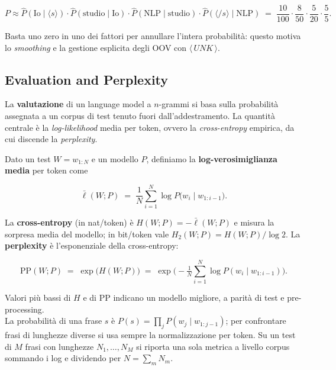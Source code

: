     $$
    P \approx \hat P(\text{Io}\mid \langle s\rangle) \cdot \hat P(\text{studio}\mid \text{Io}) \cdot \hat P(\text{NLP}\mid \text{studio}) \cdot \hat P(\langle/ s\rangle \mid \text{NLP}) \;=\; \frac{10}{100} \cdot \frac{8}{50} \cdot \frac{5}{20} \cdot \frac{5}{5}.
    $$
    
    Basta uno zero in uno dei fattori per annullare l'intera probabilità: questo motiva lo \textit{smoothing} e la gestione esplicita degli OOV con $\langle\,UNK\,\rangle$.

    \newpage

    \subsection{Evaluation and Perplexity}
    
        La \textbf{valutazione} di un language model a $n$-grammi si basa sulla probabilità assegnata a un corpus di test tenuto fuori dall’addestramento. La quantità centrale è la \textit{log-likelihood} media per token, ovvero la \textit{cross-entropy} empirica, da cui discende la \textit{perplexity}.
        
        Dato un test $W=w_{1:N}$ e un modello $P$, definiamo la \textbf{log-verosimiglianza media} per token come
        
        $$
        \bar{\ell}(W;P) \;=\; \frac{1}{N} \sum_{i=1}^{N} \log P\!\big(w_i \mid w_{1:i-1}\big).
        $$
        
        La \textbf{cross-entropy} (in nat/token) è $H(W;P) = -\bar{\ell}(W;P)$ e misura la sorpresa media del modello; in bit/token vale $H_2(W;P)=H(W;P)/\log 2$. La \textbf{perplexity} è l’esponenziale della cross-entropy:
        
        $$
        \mathrm{PP}(W;P) \;=\; \exp\!\big( H(W;P) \big) \;=\; \exp\!\Big( -\tfrac{1}{N} \sum_{i=1}^{N} \log P(w_i \mid w_{1:i-1}) \Big).
        $$
        
        Valori più bassi di $H$ e di $\mathrm{PP}$ indicano un modello migliore, a parità di test e pre-processing.\\
        
        La probabilità di una frase $s$ è $P(s)=\prod_j P(w_j\mid w_{1:j-1})$; per confrontare frasi di lunghezze diverse si usa sempre la normalizzazione per token. Su un test di $M$ frasi con lunghezze $N_1,\dots,N_M$ si riporta una sola metrica a livello corpus sommando i log e dividendo per $N=\sum_m N_m$.\\

